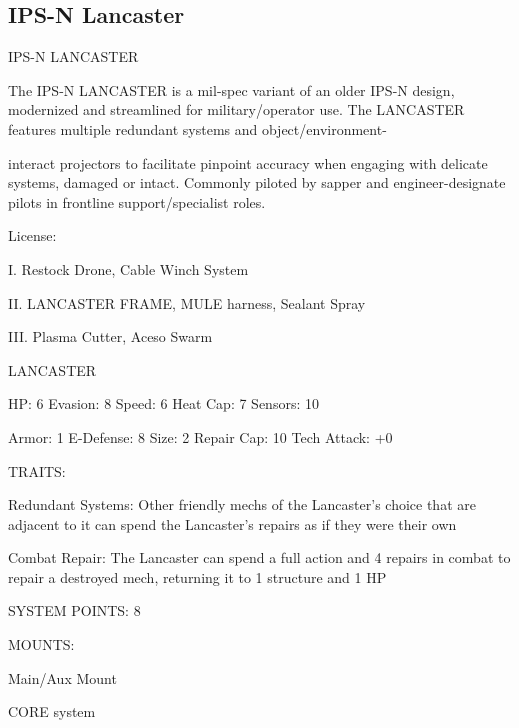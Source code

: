 \subsection{IPS-N Lancaster}

                                         IPS-N LANCASTER  

The IPS-N LANCASTER is a mil-spec variant of an older IPS-N design, modernized and streamlined for  
military/operator use. The LANCASTER features multiple redundant systems and object/environment- 

interact projectors to facilitate pinpoint accuracy when engaging with delicate systems, damaged or intact.  
Commonly piloted by sapper and engineer-designate pilots in frontline support/specialist roles. 
 

                                                   License:
 
I. Restock Drone, Cable Winch System
 
II. LANCASTER FRAME, MULE harness, Sealant Spray
 
III. Plasma Cutter, Aceso Swarm
 

                                                LANCASTER 

  HP: 6          Evasion: 8                            Speed: 6           Heat Cap: 7        Sensors: 10 

  Armor: 1       E-Defense: 8                          Size: 2            Repair Cap: 10     Tech Attack:  
                                                                                             +0 

                                                   TRAITS: 

  Redundant Systems: Other friendly mechs of the Lancaster’s choice that are adjacent to it can spend  
  the Lancaster’s repairs as if they were their own
 
  Combat Repair: The Lancaster can spend a full action and 4 repairs in combat to repair a destroyed  
  mech, returning it to 1 structure and 1 HP 

                                             SYSTEM POINTS: 8 

                                                   MOUNTS: 

  Main/Aux Mount 

                                                CORE system 

                                                                                                            


